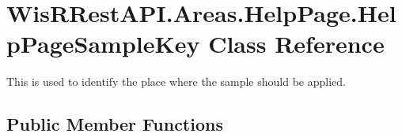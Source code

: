\hypertarget{class_wis_r_rest_a_p_i_1_1_areas_1_1_help_page_1_1_help_page_sample_key}{}\section{Wis\+R\+Rest\+A\+P\+I.\+Areas.\+Help\+Page.\+Help\+Page\+Sample\+Key Class Reference}
\label{class_wis_r_rest_a_p_i_1_1_areas_1_1_help_page_1_1_help_page_sample_key}


This is used to identify the place where the sample should be applied.  


\subsection*{Public Member Functions}
